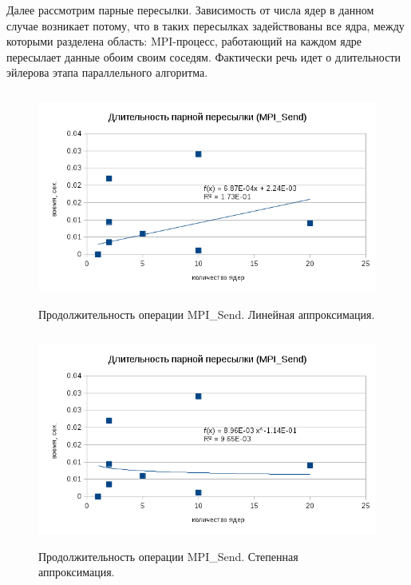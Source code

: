         Далее рассмотрим парные пересылки. Зависимость от числа ядер в данном случае возникает потому, что в таких пересылках задействованы все ядра, между которыми разделена область: MPI-процесс, работающий на каждом ядре пересылает данные обоим своим соседям. Фактически речь идет о длительности эйлерова этапа параллельного алгоритма.
        
         \begin{figure}[htb]
         	\begin{center}
         		\includegraphics[height=7cm,keepaspectratio]{images/RomanenkoAASnytnikovAVChernykhIGadaptationtosupercomputerfinalEXTENDEDREFERENCES-img5.png}
         	\end{center}
         	\caption{Продолжительность операции MPI\_Send. Линейная аппроксимация.}
         	\label{send_lin_appr}
         \end{figure}
         
         
         \begin{figure}[htb]
         	\begin{center}
         		\includegraphics[height=7cm,keepaspectratio]{images/RomanenkoAASnytnikovAVChernykhIGadaptationtosupercomputerfinalEXTENDEDREFERENCES-img6.png}
         	\end{center}
         	\caption{ Продолжительность операции MPI\_Send. Степенная аппроксимация.}
         	\label{send_power_appr}
         \end{figure}
         
